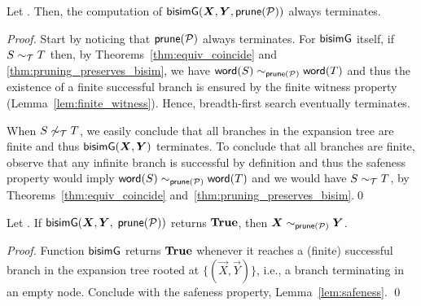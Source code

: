\begin{lemma}[Termination]
  \label{lem:termination}
  Let \grmcontext. Then, the computation of $\Bisim(\vec X,\vec Y, \Prune(\productions))$
  always terminates.
\end{lemma}
%
\begin{proof}
  Start by noticing that $\mathsf{prune}(\mathcal P)$ always terminates.
  For $\mathsf{bisimG}$ itself, if $S\sim_\mathcal T T$ then, by
  Theorems~\ref{thm:equiv_coincide} and
  \ref{thm:pruning_preserves_bisim}, we have
  $\mathsf{word}(S) \sim_{\mathsf{prune}(\mathcal P)} \mathsf{word}(T) $ and thus the
  existence of a finite successful branch is ensured by the finite
  witness property (Lemma~\ref{lem:finite_witness}).  Hence,
  breadth-first search eventually terminates.
  
  When $S\not\sim_\mathcal T T$, we easily conclude that all branches in
  the expansion tree are finite and thus $\Bisim(\vec X,\vec Y)$
  terminates.  To conclude that all branches are finite, observe that
  any infinite branch is successful by definition and thus the
  safeness property would imply $\mathsf{word}(S) \sim_{\mathsf{prune}(\mathcal P)} \mathsf{word}(T)$ 
  and we would have
  $S\sim_\mathcal T T$, by Theorems~\ref{thm:equiv_coincide}
  and~\ref{thm:pruning_preserves_bisim}.\qed
\end{proof}


\begin{lemma}
  \label{lem:bisimilar-to-prod}
  \begin{sloppypar}
  	Let \grmcontext.  If 
  $\Bisim(\vec X,\vec Y,$ $ \mathsf{prune}(\mathcal P))$ returns $\mathbf{True}$, then
  $\vec X \sim_{\Prune(\productions)} \vec Y$.
  \end{sloppypar}
\end{lemma}

\begin{proof}
  Function $\mathsf{bisimG}$ returns $\mathbf{True}$ whenever it reaches a (finite)
  successful branch in the expansion tree rooted at
  $\{(\vec X,\vec Y)\}$, i.e., a branch terminating in an empty node. 
  Conclude with the safeness property,
  Lemma~\ref{lem:safeness}. \qed
\end{proof}

